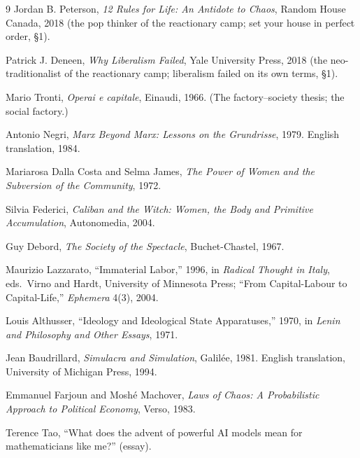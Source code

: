 \documentclass[11pt]{article}
\begin{document}
\begin{thebibliography}{9}
 Jordan B. Peterson, \textit{12 Rules for Life:
An Antidote to Chaos}, Random House Canada, 2018 (the pop thinker of
the reactionary camp; set your house in perfect order, \S 1).

 Patrick J. Deneen, \textit{Why Liberalism
Failed}, Yale University Press, 2018 (the neo-traditionalist of the
reactionary camp; liberalism failed on its own terms, \S 1).

 Mario Tronti, \textit{Operai e capitale}, Einaudi,
1966. (The factory--society thesis; the social factory.)

 Antonio Negri, \textit{Marx Beyond Marx: Lessons on
the Grundrisse}, 1979. English translation, 1984.

 Mariarosa Dalla Costa and Selma James,
\textit{The Power of Women and the Subversion of the Community}, 1972.

 Silvia Federici, \textit{Caliban and the Witch:
Women, the Body and Primitive Accumulation}, Autonomedia, 2004.

 Guy Debord, \textit{The Society of the Spectacle},
Buchet-Chastel, 1967.

 Maurizio Lazzarato, ``Immaterial Labor,'' 1996,
in \textit{Radical Thought in Italy}, eds.\ Virno and Hardt, University
of Minnesota Press; ``From Capital-Labour to Capital-Life,''
\textit{Ephemera} 4(3), 2004.

 Louis Althusser, ``Ideology and Ideological State
Apparatuses,'' 1970, in \textit{Lenin and Philosophy and Other Essays},
1971.

 Jean Baudrillard, \textit{Simulacra and
Simulation}, Galil\'ee, 1981. English translation, University of
Michigan Press, 1994.

 Emmanuel Farjoun and Mosh\'e Machover,
\textit{Laws of Chaos: A Probabilistic Approach to Political Economy},
Verso, 1983.

 Terence Tao, ``What does the advent of powerful AI models
mean for mathematicians like me?'' (essay).

\end{thebibliography}
\end{document}
